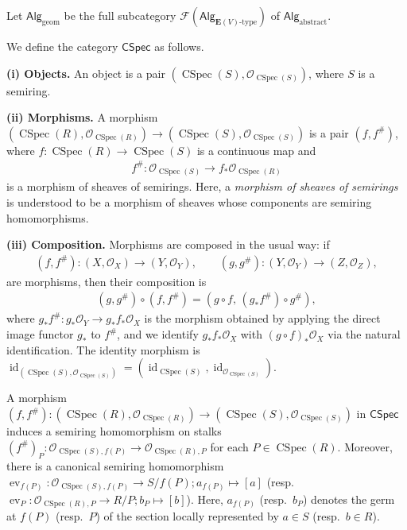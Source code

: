 \documentclass[a4paper,12pt]{amsart}
\theoremstyle{plain}
\theoremstyle{definition}
\begin{document}
Let $\mathsf{Alg}_{\mathrm{geom}}$ be the full subcategory $\mathcal{F}(\mathsf{Alg}_{\boldsymbol{E}(V)\text{-type}})$ of $\mathsf{Alg}_{\mathrm{abstract}}$.

\smallskip

We define the category $\mathsf{CSpec}$ as follows.

\textbf{(i) Objects.} An object is a pair $(\operatorname{CSpec}(S), \mathcal{O}_{\operatorname{CSpec}(S)} )$, where $S$ is a semiring.

\textbf{(ii) Morphisms.} A morphism $(\operatorname{CSpec}(R), \mathcal{O}_{\operatorname{CSpec}(R)}) \to (\operatorname{CSpec}(S), \mathcal{O}_{\operatorname{CSpec}(S)})$ is a pair $(f,f^{\#})$, where $f : \operatorname{CSpec}(R) \to \operatorname{CSpec}(S)$ is a continuous map and
\begin{align*}
f^{\#} : \mathcal{O}_{\operatorname{CSpec}(S)} \to f_{\ast}\mathcal{O}_{\operatorname{CSpec}(R)}
\end{align*}
is a morphism of sheaves of semirings.
Here, a \textit{morphism of sheaves of semirings} is understood to be a morphism of sheaves whose components are semiring homomorphisms.

\textbf{(iii) Composition.} Morphisms are composed in the usual way:
if
\begin{align*}
(f,f^\#): (X,\mathcal{O}_X) \to (Y, \mathcal{O}_Y), \qquad (g,g^\#): (Y,\mathcal{O}_Y) \to (Z,\mathcal{O}_Z),
\end{align*}
are morphisms, then their composition is
\begin{align*}
(g,g^\#)\circ(f,f^\#) = (g \circ f,\, (g_{\ast}f^{\#}) \circ g^{\#}),
\end{align*}
where $g_{\ast}f^{\#} :g_{\ast}\mathcal{O}_Y \to g_{\ast}f_{\ast}\mathcal{O}_X$ is the morphism obtained by applying the direct image functor $g_{\ast}$ to $f^{\#}$, and we identify $g_{\ast}f_{\ast} \mathcal{O}_X$ with $(g \circ f)_{\ast} \mathcal{O}_X$ via the natural identification.
The identity morphism is $\operatorname{id}_{(\operatorname{CSpec}(S), \mathcal{O}_{\operatorname{CSpec}(S)})} = ( \operatorname{id}_{\operatorname{CSpec}(S)}, \operatorname{id}_{\mathcal{O}_{\operatorname{CSpec}(S)}})$.

A morphism $(f, f^\#) : (\operatorname{CSpec}(R), \mathcal{O}_{\operatorname{CSpec}(R)}) \to (\operatorname{CSpec}(S), \mathcal{O}_{\operatorname{CSpec}(S)})$ in $\mathsf{CSpec}$ induces a semiring homomorphism on stalks $(f^{\#})_P : \mathcal{O}_{\operatorname{CSpec}(S),f(P)} \to \mathcal{O}_{\operatorname{CSpec}(R),P}$ for each $P \in \operatorname{CSpec}(R)$.
Moreover, there is a canonical semiring homomorphism $\operatorname{ev}_{f(P)} :\mathcal{O}_{\operatorname{CSpec}(S),f(P)} \to S / f(P); a_{f(P)} \mapsto [a]$ (resp.~$ \operatorname{ev}_P : \mathcal{O}_{\operatorname{CSpec}(R),P} \to R / P; b_P \mapsto [b]$).
Here, $a_{f(P)}$ (resp.~$b_P$) denotes the germ at $f(P)$ (resp.~$P$) of the section locally represented by $a \in S$ (resp.~$b \in R$).
\end{document}
